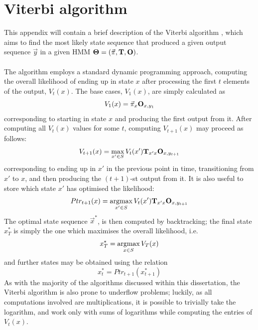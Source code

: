 \documentclass[12pt,a4paper,twoside,openright]{report}
\newcommand\myeq{\stackrel{\mathclap{\tiny\mbox{def}}}{=}}
\newcommand{\argmax}{\operatornamewithlimits{argmax}}
\begin{document}

\section{Viterbi algorithm}\label{secviterbi}

This appendix will contain a brief description of the Viterbi algorithm \cite{viterbi1967error}, which aims to find the most likely state sequence that produced a given output sequence $\vec{y}$ in a given HMM ${\bf\Theta} = (\vec{\pi}, {\bf T}, {\bf O})$.\\ \\
The algorithm employs a standard dynamic programming approach, computing the overall likelihood of ending up in state $x$ after processing the first $t$ elements of the output, $V_t(x)$. The base cases, $V_1(x)$, are simply calculated as
\[V_1(x) = \vec{\pi}_x{\bf O}_{x, y_1}\]
corresponding to starting in state $x$ and producing the first output from it. After computing all $V_t(x)$ values for some $t$, computing $V_{t+1}(x)$ may proceed as follows:
\[V_{t+1}(x) = \max_{x'\in S}{V_t(x'){\bf T}_{x'x}{\bf O}_{x, y_{t+1}}}\]
corresponding to ending up in $x'$ in the previous point in time, transitioning from $x'$ to $x$, and then producing the $(t+1)$-st output from it. It is also useful to store which state $x'$ has optimised the likelihood:
\[Ptr_{t+1}(x) = \argmax_{x'\in S}{V_t(x'){\bf T}_{x'x}{\bf O}_{x, y_{t+1}}}\]
The optimal state sequence $\vec{x}^*$, is then computed by backtracking; the final state $x_T^*$ is simply the one which maximises the overall likelihood, i.e.
\[x_T^* = \argmax_{x\in S} V_T(x)\]
and further states may be obtained using the relation
\[x_t^* = Ptr_{t+1}(x_{t+1}^*)\]
As with the majority of the algorithms discussed within this dissertation, the Viterbi algorithm is also prone to underflow problems; luckily, as all computations involved are multiplications, it is possible to trivially take the logarithm, and work only with sums of logarithms while computing the entries of $V_t(x)$.
\end{document}
